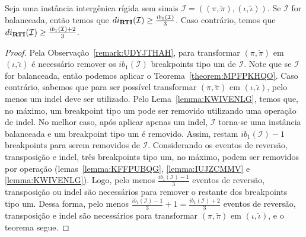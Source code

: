 \begin{theorem}\label{theorem:JDOIUJLE}
Seja uma instância intergênica rígida sem sinais $\mathcal{I} = ((\pi,\breve\pi),(\iota,\breve\iota))$. Se $\mathcal{I}$ for balanceada, então temos que $di_{\textbf{RTI}}(\mathcal{I}) \ge \frac{ib_1(\mathcal{I})}{3}$. Caso contrário, temos que $di_{\textbf{RTI}}(\mathcal{I}) \ge \frac{ib_1(\mathcal{I}) + 2}{3}$.
\end{theorem}
\begin{proof}
Pela Observação~\ref{remark:UDYJTHAH}, para transformar $(\pi,\breve\pi)$ em $(\iota,\breve\iota)$ é necessário remover os $ib_1(\mathcal{I})$ breakpoints tipo um de $\mathcal{I}$. Note que se $\mathcal{I}$ for balanceada, então podemos aplicar o Teorema~\ref{theorem:MPFPKHQO}. Caso contrário, sabemos que para ser possível transformar $(\pi,\breve\pi)$ em $(\iota,\breve\iota)$, pelo menos um indel deve ser utilizado. Pelo Lema~\ref{lemma:KWIVENLG}, temos que, no máximo, um breakpoint tipo um pode ser removido utilizando uma operação de indel. No melhor caso, após aplicar apenas um indel, $\mathcal{I}$  torna-se uma instância balanceada e um breakpoint tipo um é removido. Assim, restam $ib_1(\mathcal{I}) - 1$ breakpoints para serem removidos de $\mathcal{I}$. Considerando os eventos de reversão, transposição e indel, três breakpoints tipo um, no máximo, podem ser removidos por operação (lemas~\ref{lemma:KFFPUBQG}, \ref{lemma:IUJZCMMV} e \ref{lemma:KWIVENLG}). Logo, pelo menos $\frac{ib_1(\mathcal{I}) - 1}{3}$ eventos de reversão, transposição ou indel são necessários para remover o restante dos breakpoints tipo um. Dessa forma, pelo menos $\frac{ib_1(\mathcal{I}) - 1}{3} + 1 = \frac{ib_1(\mathcal{I}) + 2}{3}$ eventos de reversão, transposição e indel são necessários para transformar $(\pi,\breve\pi)$ em $(\iota,\breve\iota)$, e o teorema segue.
\end{proof}


